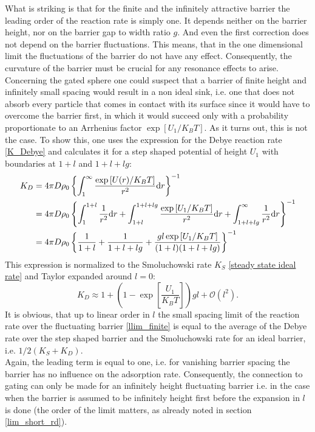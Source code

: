 What is striking is that for the finite and the infinitely attractive barrier the leading order of the reaction rate is simply one. It depends neither on the barrier height, nor on the barrier gap to width ratio $g$. And even the first correction does not depend on the barrier fluctuations. This means, that in the one dimensional limit the fluctuations of the barrier do not have any effect. Consequently, the curvature of the barrier must be crucial for any resonance effects to arise.\\
Concerning the gated sphere one could suspect that a barrier of finite height and infinitely small spacing would result in a non ideal sink, i.e. one that does not absorb every particle that comes in contact with its surface since it would have to overcome the barrier first, in which it would succeed only with a probability proportionate to an Arrhenius factor $\exp\left[U_1/K_B T \right]$. As it turns out, this is not the case. To show this, one uses the expression for the Debye reaction rate \eqref{K_Debye} and calculates it for a step shaped potential of height $U_1$ with boundaries at $1+l$ and $1+l+lg$:
\begin{align}
    K_D   &= 4 \pi D \rho_0 \left\{ \int_{1}^{\infty} \frac{\exp \left[U(r)/K_B T \right]}{r^2} {\rm d} r \right\}^{-1} \nonumber \\
    &=4 \pi D \rho_0 \left\{ \int_{1}^{1+l} \frac{1}{r^2}{\rm d}r + \int_{1+l}^{1+l+lg} \frac{\exp \left[U_1/K_B T \right]}{r^2} {\rm d} r + \int_{1+l+lg}^{\infty}\frac{1}{r^2}{\rm d}r \right\}^{-1} \nonumber \\
    &= 4 \pi D \rho_0 \left\{ \frac{1}{1+l} + \frac{1}{1+l+lg} + \frac{g l\exp \left[U_1/K_B T \right]}{ (1+l)(1+l+lg)} \right\}^{-1}
    \label{Debye_llimit}
\end{align}
This expression is normalized to the Smoluchowski rate $K_S$ \eqref{steady state ideal rate} and Taylor expanded around $l=0$:
\begin{equation}
    K_D \approx 1+\left(1-\exp\left[\frac{U_1}{K_B T}\right] \right)gl + \mathcal{O}(l^2).
    \label{Debye_taylor}
\end{equation}
It is obvious, that up to linear order in $l$ the small spacing limit of the reaction rate over the fluctuating barrier \eqref{llim_finite} is equal to the average of the Debye rate over the step shaped barrier and the Smoluchowski rate for an ideal barrier, i.e. $1/2 (K_S + K_D)$. \\
Again, the leading term is equal to one, i.e. for vanishing barrier spacing the barrier has no influence on the adsorption rate. Consequently, the connection to gating can only be made for an infinitely height fluctuating barrier i.e. in the case when the barrier is assumed to be infinitely height first before the expansion in $l$ is done (the order of the limit matters, as already noted in section \ref{lim_short_rd}). \\
